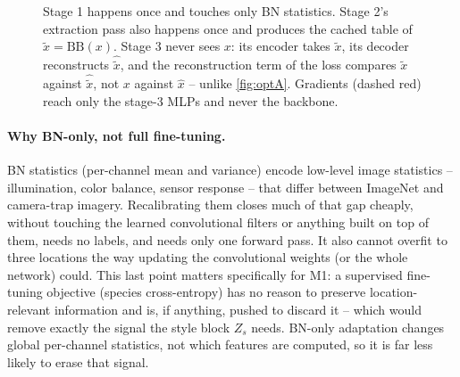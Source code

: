 \begin{figure}[H]
\caption{\textbf{} Stage 1 happens once and touches only BN statistics. Stage 2's
extraction pass also happens once and produces the cached table of $\tilde x=\mathrm{BB}(x)$. Stage 3
never sees $x$: its encoder takes $\tilde x$, its decoder reconstructs $\hat{\tilde x}$, and the
reconstruction term of the loss compares $\tilde x$ against $\hat{\tilde x}$, not $x$ against
$\hat x$ -- unlike \cref{fig:optA}. Gradients (dashed red) reach only the stage-3 MLPs and never the
backbone.}
\label{fig:optB}
\end{figure}

\paragraph{Why BN-only, not full fine-tuning.}
BN statistics (per-channel mean and variance) encode low-level image statistics -- illumination,
color balance, sensor response -- that differ between ImageNet and camera-trap imagery.
Recalibrating them closes much of that gap cheaply, without touching the learned convolutional
filters or anything built on top of them, needs no labels, and needs only one forward pass. It also
cannot overfit to three locations the way updating the convolutional weights (or the whole network)
could. This last point matters specifically for M1: a supervised fine-tuning objective (species
cross-entropy) has no reason to preserve location-relevant information and is, if anything, pushed to
discard it -- which would remove exactly the signal the style block $Z_s$ needs. BN-only adaptation
changes global per-channel statistics, not which features are computed, so it is far less likely to
erase that signal.

